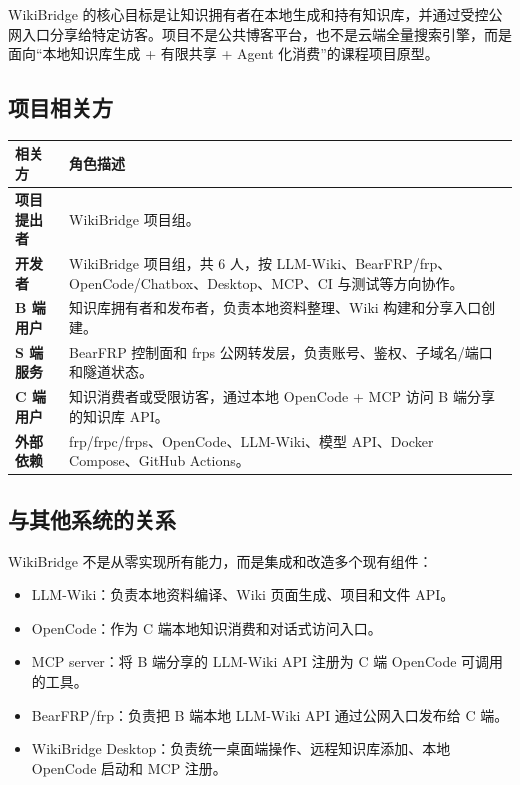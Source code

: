 \documentclass[UTF8,a4paper,12pt,fontset=fandol]{ctexart}
\begin{document}
WikiBridge 的核心目标是让知识拥有者在本地生成和持有知识库，并通过受控公网入口分享给特定访客。项目不是公共博客平台，也不是云端全量搜索引擎，而是面向“本地知识库生成 + 有限共享 + Agent 化消费”的课程项目原型。

\subsection{项目相关方}
\begin{longtable}{>{\bfseries}p{3.4cm}p{10.8cm}}
\toprule
相关方 & 角色描述 \\
\midrule
项目提出者 & WikiBridge 项目组。 \\
开发者 & WikiBridge 项目组，共 6 人，按 LLM-Wiki、BearFRP/frp、OpenCode/Chatbox、Desktop、MCP、CI 与测试等方向协作。 \\
B 端用户 & 知识库拥有者和发布者，负责本地资料整理、Wiki 构建和分享入口创建。 \\
S 端服务 & BearFRP 控制面和 frps 公网转发层，负责账号、鉴权、子域名/端口和隧道状态。 \\
C 端用户 & 知识消费者或受限访客，通过本地 OpenCode + MCP 访问 B 端分享的知识库 API。 \\
外部依赖 & frp/frpc/frps、OpenCode、LLM-Wiki、模型 API、Docker Compose、GitHub Actions。 \\
\bottomrule
\end{longtable}

\subsection{与其他系统的关系}
WikiBridge 不是从零实现所有能力，而是集成和改造多个现有组件：
\begin{itemize}
  \item LLM-Wiki：负责本地资料编译、Wiki 页面生成、项目和文件 API。
  \item OpenCode：作为 C 端本地知识消费和对话式访问入口。
  \item MCP server：将 B 端分享的 LLM-Wiki API 注册为 C 端 OpenCode 可调用的工具。
  \item BearFRP/frp：负责把 B 端本地 LLM-Wiki API 通过公网入口发布给 C 端。
  \item WikiBridge Desktop：负责统一桌面端操作、远程知识库添加、本地 OpenCode 启动和 MCP 注册。
\end{itemize}
\end{document}
